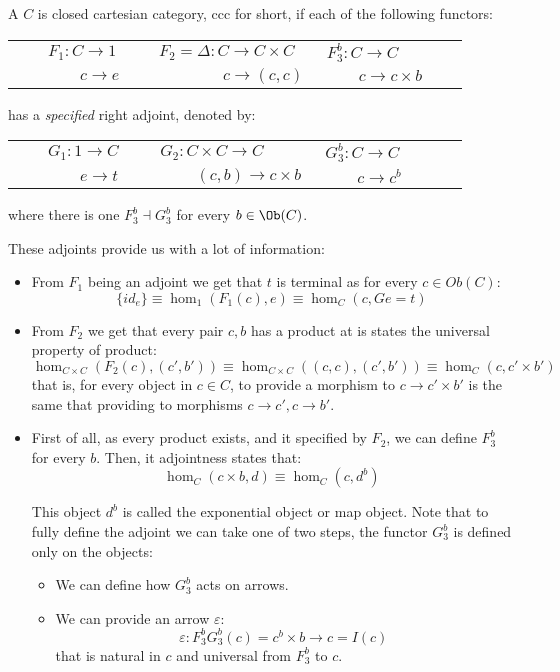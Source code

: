   \begin{definition}\label{def:CCC}
    A $C$ is closed cartesian category, ccc for short, if each of the following functors:
\begin{center}
  \begin{tabular}{p{0.3\linewidth}p{0.3\linewidth}p{0.3\linewidth}}
    $\qquad F_1:C\to 1$&$ F_2=\Delta: C \to C\times C $&$ F_{3}^b:C \to C$\\
    $\qquad \qquad c\to e$&$ \qquad \qquad c \to  (c,c)$&$ \qquad c \to c\times b$\\
  \end{tabular}
\end{center}
has a \emph{specified} right adjoint, denoted by:
\begin{center}
  \begin{tabular}{p{0.3\linewidth}p{0.3\linewidth}p{0.3\linewidth}}
    $\qquad G_1:1\to C$&$ G_2:  C\times C\to C $&$ G_{3}^b:C \to C$\\
    $\qquad \qquad e\to t$&$ \  \qquad (c,b)\to c \times b$&$ \qquad c \to c^b$\\
  \end{tabular}
  where there is one $F_3^b\dashv G_3^b$ for every $b\in \Ob(C)$.
\end{center}

These adjoints provide us with a lot of information:
\begin{itemize}
\item From $F_1$ being an adjoint we get that $t$ is terminal as for every $c\in Ob(C)$:
  $$\{id_e\} \equiv \hom_1(F_1(c), e) \equiv \hom_C(c,Ge=t)   $$
\item From $F_2$ we get that every pair $c,b$ has a product at is states the universal property of product:
  $$\hom_{C\times C}(F_2(c), (c',b'))\equiv \hom_{C\times C}((c,c), (c',b')) \equiv \hom_C(c,c'\times b')$$
  that is, for every object in $c\in C$, to provide a morphism to $c\to c'\times b'$ is the same that providing to morphisms $c\to c',c\to b'$.
\item First of all, as every product exists, and it specified by $F_2$, we can define $F_3^b$ for every $b$. Then, it adjointness states that:
  $$\hom_C(c\times b, d) \equiv \hom_C(c,d^b)   $$

  This object $d^b$ is called the exponential object or map object. Note that to fully define the adjoint we can take one of two steps,  the functor $G_3^b$ is defined only on the objects:
  \begin{itemize}
  \item We can define how $G_3^b$ acts on arrows.
  \item We can  provide an arrow $\varepsilon$:
  $$\varepsilon: F_3^bG_3^b(c) = c^b\times b \to c = I(c)$$
  that is natural in $c$ and universal from $F_3^b$ to $c$.
  \end{itemize}


\end{itemize}
\end{definition}
